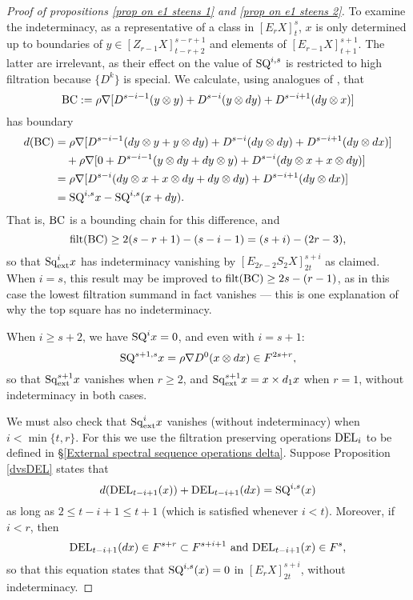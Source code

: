 \documentclass[11pt]{amsart} \renewcommand{\baselinestretch}{1.2}
\theoremstyle{plain}
\numberwithin{equation}{section} %
\theoremstyle{plain}
\numberwithin{equation}{chapter} %
\newcommand{\Nabla}{\nabla}
\newcommand{\Sq}{\mathrm{Sq}}
\newcommand{\E}[5]{[E^{#1}_{#2}#3]^{#4}_{#5}}
\newcommand{\Edownup}[5]{[E_{#1}^{#2}#3]^{#4}_{#5}}
\newcommand{\EZdownup}[5]{[Z^{#2}_{#1}#3]^{#4}_{#5}}
\newcommand{\filt}{\mathrm{filt}}
\begin{document}
\begin{second quadrant homotopy sseq operations}
\begin{proof}[Proof of propositions \ref{prop on e1 steens 1} and \ref{prop on e1 steens 2}]
To examine the indeterminacy, as a representative of a class in $\Edownup{r}{}{X}{s}{t}$,  $x$ is only determined up to boundaries of $y\in \EZdownup{r-1}{}{X}{s-r+1}{t-r+2}  $ and elements of $\Edownup{r-1}{}{X}{s+1}{t+1}$. The latter are irrelevant, as their effect on the value of $\textup{SQ}^{i,s}$ is restricted to high filtration because $\{D^k\}$ is special.
We calculate, using analogues of \cite[(1.111) and (1.112)]{MR2245560}, that
\[\textup{BC}:=\rho\Nabla [D^{s-i-1}(y\otimes y)+D^{s-i}(y\otimes dy)+D^{s-i+1}(dy\otimes x)]\]
has boundary
\begin{alignat*}{2}
d(\textup{BC})
&=
\rho\Nabla [D^{s-i-1}(dy\otimes y+y\otimes dy)+D^{s-i}(dy\otimes dy)+D^{s-i+1}(dy\otimes dx)]%
\\
&\ \ \ +
\rho\Nabla [0+D^{s-i-1}(y\otimes dy+dy\otimes y)+D^{s-i}(dy\otimes x+x\otimes dy)]%
\\
&=
\rho\Nabla [D^{s-i}(dy\otimes x+x\otimes dy+dy\otimes dy)
+D^{s-i+1}(dy\otimes dx)]\\
&=\textup{SQ}^{i,s}x-\textup{SQ}^{i,s}(x+dy).%
\end{alignat*} 
That is, $\textup{BC}$ is a bounding chain for this difference, and
\[\filt(\textup{BC})\geq 2(s-r+1)-(s-i-1)=(s+i)-(2r-3),\]
so that $\Sq^i_\textup{ext}x$ has indeterminacy vanishing by $\Edownup{2r-2}{}{S_2X}{s+i}{2t}$ as claimed. When $i=s$, this result may be improved to $\filt(\textup{BC})\geq 2s-(r-1)$,  as in this case the lowest filtration summand in fact vanishes --- this is one explanation of why the top square has no indeterminacy.

When $i\geq s+2$, we have $\textup{SQ}^{i}x=0$, and even with $i=s+1$:
\[\textup{SQ}^{s+1,s}x=\rho\nabla D^{0}(x\otimes dx)\in F^{2s+r},\]
so that $\Sq^{s+1}_\textup{ext}x$ vanishes when $r\geq2$,  and $\Sq^{s+1}_\textup{ext}x=x\times d_1x$  when $r=1$, without indeterminacy in both cases. 

We must also check that $\Sq^i_\textup{ext}x$ vanishes (without indeterminacy) when $i<\min\{t,r\}$. For this we use the filtration preserving operations $\textup{DEL}_i$ to be defined in \S\ref{External spectral sequence operations delta}. Suppose   Proposition \ref{dvsDEL} states that
\[d(\textup{DEL}_{t-i+1}(x))+ \textup{DEL}_{t-i+1}(dx)=
\textup{SQ}^{i,s}(x)\]
as long as $2\leq t-i+1\leq t+1$ (which is satisfied whenever $i<t$). Moreover, if $i<r$, then 
\[ \textup{DEL}_{t-i+1}(dx)\in F^{s+r}\subset F^{s+i+1}\textup{ and }\textup{DEL}_{t-i+1}(x)\in F^{s},\]
so that this equation states that $\textup{SQ}^{i,s}(x)=0$ in $\E{}{r}{X}{s+i}{2t}$, without indeterminacy.



\end{proof}
\end{second quadrant homotopy sseq operations}
\end{document}
